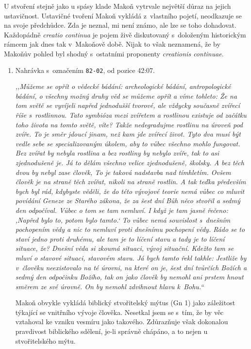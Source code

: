 U stvoření stejně jako u spásy klade Makoň vytrvale největší důraz na jejich
ustavičnost. Ustavičné tvoření Makoň vykládá z~vlastního pojetí, neodkazuje se
na svoje předchůdce. Zda je neznal, mi není známo, ale lze se toho dohadovat.
Každopádně \textit{creatio continua} je pojem živě diskutovaný s~doloženým
historickým rámcem jak dnes\cite{congdon2010creatio}\cite{Salim2022Creatio} tak
v~Makoňově době.\cite{marcus1957typen} Nijak to však neznamená, že by Makoňův
pohled byl shodný s~ostatními proponenty \textit{creationis continuae}.

\begin{enumerate}

\item{
Nahrávka s~označením \texttt{82-02}, od pozice 42:07.

\textit{%
,,Můžeme se opřít o vědecké bádání: archeologické bádání, antropologické bádání,
o všechny možný druhy věd se můžeme opřít a víme tohleto: Že na tom světě se
vyvíjeli napřed jednodušší tvorové, ale vždycky současně zvířecí říše
s~rostlinnou. Tato symbióza mezi zvířetem a rostlinou existuje od začátku toho
života na tomto světě, víte? Takže nedegradujme rostlinu na úroveň pod zvíře. To
je směr jdoucí jinam, než kam jde zvířecí život. Tyto dva musí být vedle sebe se
specializovaným úkolem, aby to vůbec všechno mohlo fungovat. Bez zvířat by
nebyla rostlina a bez rostliny by nebylo zvíře, tak to asi zjednodušeně je. Já
to dělám všechno velice zjednodušeně, školsky. A bez těch dvou by nebyl zase
člověk, To je taková nadstavba nad tímhletím. Ovšem člověk je na straně těch
zvířat, nikoli na straně rostlin. A tak teďka především bych byl rád, kdybyste
věděli, že do této vývojové teorie nemá vůbec co mluvit povídání Geneze ze
Starého zákona, že za šest dní Bůh něco stvořil a sedmý den odpočíval. Vůbec o
tom se tam nemluví. I když je tam jasně řečeno: ,Napřed bylo to, potom bylo
tamto.` To vůbec nemá souvislost s~dnešním pochopením vědy a nic to nemluví
proti dnešnímu pochopení vědy. Rádo se to staví jedno proti druhému, ale tam
je to líčení stavu a tady je to líčení situace, že? Dnešní věda si zkoumá
situaci, vývoj situační. Kdežto tam se mluví o stavové situaci, stavovém stavu.
Já bych tamto řekl takhle: Jestliže by v~člověku neexistovalo na té úrovni, na
které on je, šest dní tvůrčích Božích a sedmý den odpočinku Božího, tak on jako
člověk by nemohl ani prstem hnout směrem ze své úrovně. On by nemohl zdvihnout
hlavu k~Bohu.``
}

Makoň obvykle vykládá biblický stvořitelský mýtus (Gn 1) jako záležitost týkající se
vnitřního vývoje člověka. Nesetkal jsem se s~tím, že by věc vztahoval ke
vzniku vesmíru jako takového. Zdůrazňuje však dokonalou pravdivost
biblického sdělení, je-li správně chápáno, a to nejen u stvořitelského
mýtu.

}
\end{enumerate}
